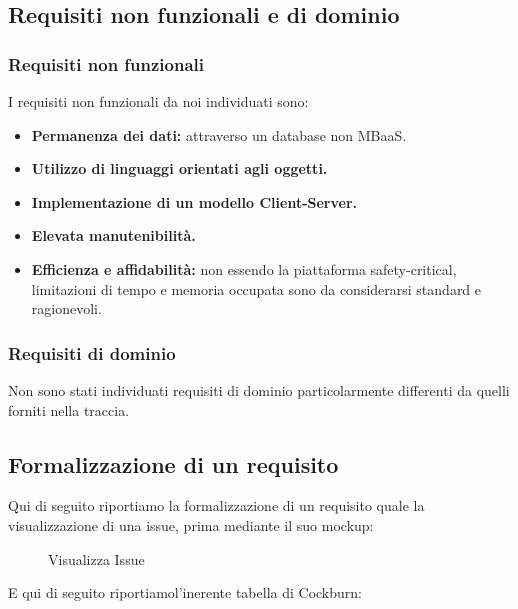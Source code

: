 \documentclass[a4paper, 11pt]{article}
\begin{document}
\newpage
\subsection{Requisiti non funzionali e di dominio}
\subsubsection{Requisiti non funzionali}
I requisiti non funzionali da noi individuati sono:
\begin{itemize}
    \item \textbf{Permanenza dei dati:} attraverso un database non MBaaS.
    \item \textbf{Utilizzo di linguaggi orientati agli oggetti.}
    \item \textbf{Implementazione di un modello Client-Server.}
    \item \textbf{Elevata manutenibilità.}
    \item \textbf{Efficienza e affidabilità:} non essendo la piattaforma safety-critical, limitazioni di tempo e memoria occupata sono da considerarsi standard e ragionevoli.
\end{itemize}

\subsubsection{Requisiti di dominio}
Non sono stati individuati requisiti di dominio particolarmente differenti da quelli forniti nella traccia.

\newpage
\subsection{Formalizzazione di un requisito}
Qui di seguito riportiamo la formalizzazione di un requisito quale la visualizzazione di una issue, prima mediante il suo mockup:

\begin{figure}[H]
    \centering
    
    \caption{Visualizza Issue}
    \label{fig:visualizza_issue_mockup}
\end{figure}

\newpage
E qui di seguito riportiamol'inerente tabella di Cockburn:


\end{document}
